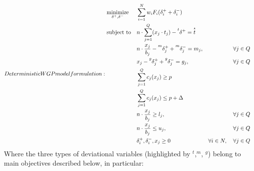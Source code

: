 \documentclass[conference,final,]{IEEEtran}
\begin{document}
\begin{subequations}
Deterministic WGP model formulation:
\begin{align}
    & \underset{\delta^+,\delta^-}{\text{minimize}} & & \sum^{N}_{i=1}w_iF_i(\delta^+_i + \delta^-_i) & \label{dm_obj} \\
    & \text{subject to} & & n\cdot \sum^{Q}_{j=1}(x_j\cdot t_j) - \prescript{t}{}{\delta^+}  =\overset{\star}{t} & \label{dm_tax} \\
    & & & n\cdot \frac{x_j}{b_j} - \prescript{m}{}{\delta^+_j} + \prescript{m}{}{\delta^-_j} = m_j, & \forall j \in Q \label{dm_median} \\
    & & & {x_j} - \prescript{g}{}{\delta^+_j} + \prescript{g}{}{\delta^-_j} = g_j, & \forall j \in Q \label{dm_management} \\
    & & & \sum^{Q}_{j=1} c_j(x_j) \geq p & \label{p_l} \\ 
    & & & \sum^{Q}_{j=1} c_j(x_j) \leq p + \Delta & \label{p_u} \\
    & & & n\cdot \frac{x_j}{b_j} \geq l_j, & \forall j \in Q \label{l_q} \\
    & & & n\cdot \frac{x_j}{b_j} \leq u_j, & \forall j \in Q \label{up_q}\\
    & & & \delta^+_i,\delta^-_i,x_j\geq 0  & \forall i \in N, \quad \forall j \in Q
\end{align}
\end{subequations}
Where the three types of deviational variables (highlighted by \(^t\),\(^m\), \(^g\)) belong to main objectives described below, in particular:
\end{document}
